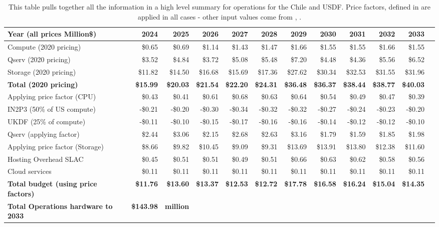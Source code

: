 \tiny \begin{longtable} { |p{}  |r  |r  |r  |r  |r  |r  |r  |r  |r  |r  |r |} 
\caption{This table pulls together all the information in a high level summary for operations  for the Chile and USDF. Price factors, defined in  are applied in all cases - other input values come from , .
 \label{tab:opsSummary}}\\ 
\hline 
\textbf{Year  (all prices Million\$)}&\textbf{2024}&\textbf{2025}&\textbf{2026}&\textbf{2027}&\textbf{2028}&\textbf{2029}&\textbf{2030}&\textbf{2031}&\textbf{2032}&\textbf{2033} \\ \hline
{Compute (2020 pricing)}&{\$0.65}&{\$0.69}&{\$1.14}&{\$1.43}&{\$1.47}&{\$1.66}&{\$1.55}&{\$1.55}&{\$1.66}&{\$1.55} \\ \hline
{Qserv (2020 pricing)}&{\$3.52}&{\$4.84}&{\$3.72}&{\$5.08}&{\$5.48}&{\$7.20}&{\$4.48}&{\$4.36}&{\$5.56}&{\$6.52} \\ \hline
{Storage (2020 pricing)}&{\$11.82}&{\$14.50}&{\$16.68}&{\$15.69}&{\$17.36}&{\$27.62}&{\$30.34}&{\$32.53}&{\$31.55}&{\$31.96} \\ \hline
\textbf{Total (2020 pricing)}&\textbf{\$15.99}&\textbf{\$20.03}&\textbf{\$21.54}&\textbf{\$22.20}&\textbf{\$24.31}&\textbf{\$36.48}&\textbf{\$36.37}&\textbf{\$38.44}&\textbf{\$38.77}&\textbf{\$40.03} \\ \hline
{Applying price factor (CPU)}&{\$0.43}&{\$0.41}&{\$0.61}&{\$0.68}&{\$0.63}&{\$0.64}&{\$0.54}&{\$0.49}&{\$0.47}&{\$0.39} \\ \hline
{IN2P3 (50\% of US compute)}&{-\$0.21}&{-\$0.20}&{-\$0.30}&{-\$0.34}&{-\$0.32}&{-\$0.32}&{-\$0.27}&{-\$0.24}&{-\$0.23}&{-\$0.20} \\ \hline
{UKDF (25\% of compute)}&{-\$0.11}&{-\$0.10}&{-\$0.15}&{-\$0.17}&{-\$0.16}&{-\$0.16}&{-\$0.14}&{-\$0.12}&{-\$0.12}&{-\$0.10} \\ \hline
{Qserv (applying factor)}&{\$2.44}&{\$3.06}&{\$2.15}&{\$2.68}&{\$2.63}&{\$3.16}&{\$1.79}&{\$1.59}&{\$1.85}&{\$1.98} \\ \hline
{Applying price factor (Storage)}&{\$8.66}&{\$9.82}&{\$10.45}&{\$9.09}&{\$9.31}&{\$13.69}&{\$13.91}&{\$13.80}&{\$12.38}&{\$11.60} \\ \hline
{Hosting Overhead SLAC}&{\$0.45}&{\$0.51}&{\$0.51}&{\$0.49}&{\$0.51}&{\$0.66}&{\$0.63}&{\$0.62}&{\$0.58}&{\$0.56} \\ \hline
{Cloud services}&{\$0.11}&{\$0.11}&{\$0.11}&{\$0.11}&{\$0.11}&{\$0.11}&{\$0.11}&{\$0.11}&{\$0.11}&{\$0.11} \\ \hline
\textbf{Total budget (using price factors)}&\textbf{\$11.76}&\textbf{\$13.60}&\textbf{\$13.37}&\textbf{\$12.53}&\textbf{\$12.72}&\textbf{\$17.78}&\textbf{\$16.58}&\textbf{\$16.24}&\textbf{\$15.04}&\textbf{\$14.35} \\ \hline
\textbf{Total Operations hardware to 2033}&\textbf{\$143.98}&\textbf{million}&&&&&&&& \\ \hline
\end{longtable} \normalsize
